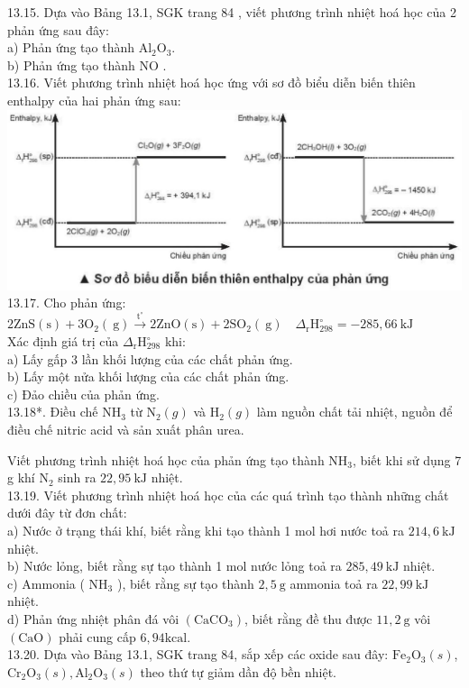 \documentclass[10pt]{article}
\begin{document}
13.15. Dựa vào Bảng 13.1, SGK trang 84 , viết phương trình nhiệt hoá học của 2 phản ứng sau đây:\\
a) Phản ứng tạo thành $\mathrm{Al}_{2} \mathrm{O}_{3}$.\\
b) Phản ứng tạo thành NO .\\
13.16. Viết phương trình nhiệt hoá học ứng với sơ đồ biểu diễn biến thiên enthalpy của hai phản ứng sau:\\
\includegraphics[max width=\textwidth, center]{2025_10_23_883c4b146e2332109fcdg-50}\\
13.17. Cho phản ứng:\\
$2 \mathrm{ZnS}(\mathrm{s})+3 \mathrm{O}_{2}(\mathrm{~g}) \xrightarrow{\mathrm{t}^{\circ}} 2 \mathrm{ZnO}(\mathrm{s})+2 \mathrm{SO}_{2}(\mathrm{~g}) \quad \Delta_{\mathrm{r}} \mathrm{H}_{298}^{\circ}=-285,66 \mathrm{~kJ}$\\
Xác định giá trị của $\Delta_{\mathrm{r}} \mathrm{H}_{298}^{\circ}$ khi:\\
a) Lấy gấp 3 lần khối lượng của các chất phản ứng.\\
b) Lấy một nửa khối lượng của các chất phản ứng.\\
c) Đảo chiều của phản ứng.\\
13.18*. Điều chế $\mathrm{NH}_{3}$ từ $\mathrm{N}_{2}(g)$ và $\mathrm{H}_{2}(g)$ làm nguồn chất tải nhiệt, nguồn để điều chế nitric acid và sản xuất phân urea.

Viết phương trình nhiệt hoá học của phản ứng tạo thành $\mathrm{NH}_{3}$, biết khi sử dụng 7 g khí $\mathrm{N}_{2}$ sinh ra $22,95 \mathrm{~kJ}$ nhiệt.\\
13.19. Viết phương trình nhiệt hoá học của các quá trình tạo thành những chất dưới đây từ đơn chất:\\
a) Nước ở trạng thái khí, biết rằng khi tạo thành 1 mol hơi nước toả ra $214,6 \mathrm{~kJ}$ nhiệt.\\
b) Nước lỏng, biết rằng sự tạo thành 1 mol nước lỏng toả ra $285,49 \mathrm{~kJ}$ nhiệt.\\
c) Ammonia ( $\mathrm{NH}_{3}$ ), biết rằng sự tạo thành $2,5 \mathrm{~g}$ ammonia toả ra $22,99 \mathrm{~kJ}$ nhiệt.\\
d) Phản ứng nhiệt phân đá vôi $\left(\mathrm{CaCO}_{3}\right)$, biết rằng đề thu được $11,2 \mathrm{~g}$ vôi $(\mathrm{CaO})$ phải cung cấp $6,94 \mathrm{kcal}$.\\
13.20. Dựa vào Bảng 13.1, SGK trang 84, sắp xếp các oxide sau đây: $\mathrm{Fe}_{2} \mathrm{O}_{3}(s)$, $\mathrm{Cr}_{2} \mathrm{O}_{3}(s), \mathrm{Al}_{2} \mathrm{O}_{3}(s)$ theo thứ tự giảm dần độ bền nhiệt.
\end{document}
